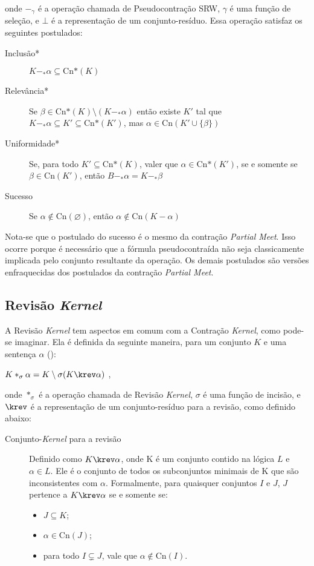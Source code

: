 onde $ -_{\gamma} $ é a operação chamada de Pseudocontração SRW, $ \gamma $ é uma função de seleção, e $ \bot $ é a representação de um conjunto-resíduo. Essa operação satisfaz os seguintes postulados:

\begin{description}
	\item[Inclusão*] $ K -_* \alpha \subseteq \text{Cn*}(K)$
	\item[Relevância*] Se $ \beta \in \text{Cn*}(K) \setminus (K -_* \alpha) $ então existe  $ K' $ tal que $ K -_* \alpha \subseteq K' \subseteq \text{Cn*}(K') $, mas $ \alpha \in \text{Cn}(K' \cup \{\beta\}) $
	\item[Uniformidade*] Se, para todo $K' \subseteq \text{Cn*}(K) $, valer que $ \alpha \in \text{Cn*}(K') $, se e somente se $ \beta \in \text{Cn}(K') $, então $ B -_* \alpha = K -_* \beta $
	\item[Sucesso] Se $ \alpha \notin \text{Cn}(\varnothing) $, então $ \alpha \notin \text{Cn}(K - \alpha) $
\end{description}

Nota-se que o postulado do sucesso é o mesmo da contração \textit{Partial Meet}. Isso ocorre porque é necessário que a fórmula pseudocontraída não seja classicamente implicada pelo conjunto resultante da operação. Os demais postulados são versões enfraquecidas dos postulados da contração \textit{Partial Meet}.

\subsection{Revisão \textit{Kernel}}

A Revisão \textit{Kernel} tem aspectos em comum com a Contração \textit{Kernel}, como pode-se imaginar. Ela é definida da seguinte maneira, para um conjunto $ K $ e uma sentença $ \alpha $ (\citep{revisaoRibeiro2}):

\begin{center}
	$ K \ast_\sigma \alpha = K \setminus \sigma (K \krev \alpha)$ ,
\end{center}

onde $ \ast_{\sigma} $ é a operação chamada de Revisão \textit{Kernel}, $ \sigma $ é uma função de incisão, e $ \krev $ é a representação de um conjunto-resíduo para a revisão, como definido abaixo:

\begin{description}
	\item[Conjunto-\textit{Kernel} para a revisão] Definido como $ K \krev \alpha $, onde K é um conjunto contido na lógica $ L $ e $ \alpha \in L $. Ele é o conjunto de todos os subconjuntos minimais de K que são inconsistentes com $ \alpha $. Formalmente, para quaisquer conjuntos $ I $ e $ J $, $ J $ pertence a $ K \krev \alpha $ se e somente se:
	\begin{itemize}
		\item $ J \subseteq K $;
		\item $ \alpha \in \text{Cn}(J) $;
		\item para todo $ I \subsetneq J $, vale que $ \alpha \notin \text{Cn}(I) $.
	\end{itemize}  
\end{description}

